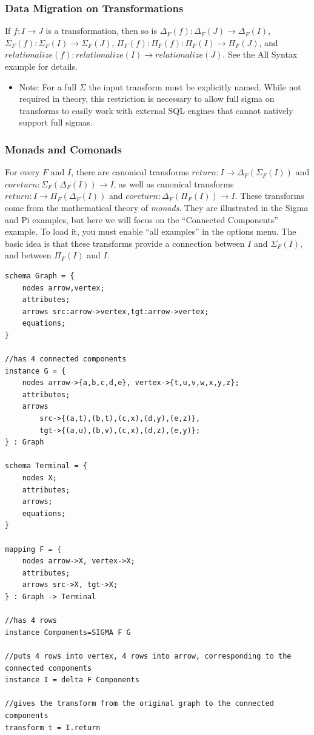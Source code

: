 \documentclass[12pt]{article}
\begin{document}
\subsubsection{Data Migration on Transformations}

If $f : I \to J$ is a transformation, then so is $\Delta_F(f) : \Delta_F(J) \to \Delta_F(I)$, $\Sigma_F(f) : \Sigma_F(I) \to \Sigma_F(J)$, $\Pi_F(f) : \Pi_F(f) : \Pi_F(I) \to \Pi_F(J)$, and $relationalize(f) : relationalize(I) \to relationalize(J)$.   See the All Syntax example for details.

\begin{itemize}
\item Note: For a full $\Sigma$ the input transform must be explicitly named.  While not required in theory, this restriction is necessary to allow full sigma on transforms to easily work with external SQL engines that cannot natively support full sigmas.
\end{itemize}

\subsubsection{Monads and Comonads}

For every $F$ and $I$, there are canonical transforms $return : I \to \Delta_F(\Sigma_F(I))$ and $coreturn : \Sigma_F(\Delta_F(I)) \to I$, as well as canonical transforms $return : I \to \Pi_F(\Delta_F(I))$ and $coreturn : \Delta_F(\Pi_F(I)) \to I$.  These transforms come from the mathematical theory of {\it monads}.  They are illustrated in the Sigma and Pi examples, but here we will focus on the ``Connected Components'' example. To load it, you must enable ``all examples'' in the options menu.  The basic idea is that these transforms provide a connection between $I$ and $\Sigma_F(I)$, and between $\Pi_F(I)$ and $I$.

\begin{verbatim}
schema Graph = {
	nodes arrow,vertex;
	attributes;
	arrows src:arrow->vertex,tgt:arrow->vertex;
	equations;
}

//has 4 connected components
instance G = {
	nodes arrow->{a,b,c,d,e}, vertex->{t,u,v,w,x,y,z};
	attributes;
	arrows
		src->{(a,t),(b,t),(c,x),(d,y),(e,z)},
		tgt->{(a,u),(b,v),(c,x),(d,z),(e,y)};
} : Graph

schema Terminal = {
	nodes X;
	attributes;
	arrows;
	equations;
} 

mapping F = {
	nodes arrow->X, vertex->X;
	attributes;
	arrows src->X, tgt->X;
} : Graph -> Terminal

//has 4 rows
instance Components=SIGMA F G

//puts 4 rows into vertex, 4 rows into arrow, corresponding to the connected components
instance I = delta F Components

//gives the transform from the original graph to the connected components
transform t = I.return
\end{verbatim}
\end{document}
